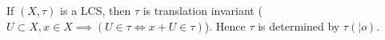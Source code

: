 \documentclass[12pt]{article}					%
\begin{document}
%	
%
%
%
%
%
%

\begin{tvrzeni}[Observation]
	If $(X, τ)$ is a LCS, then $τ$ is translation invariant ($U \subset X, x \in X \implies (U \in τ \Leftrightarrow x + U \in τ)$). Hence $τ$ is determined by $τ(¦o)$.
\end{tvrzeni}
\end{document}
